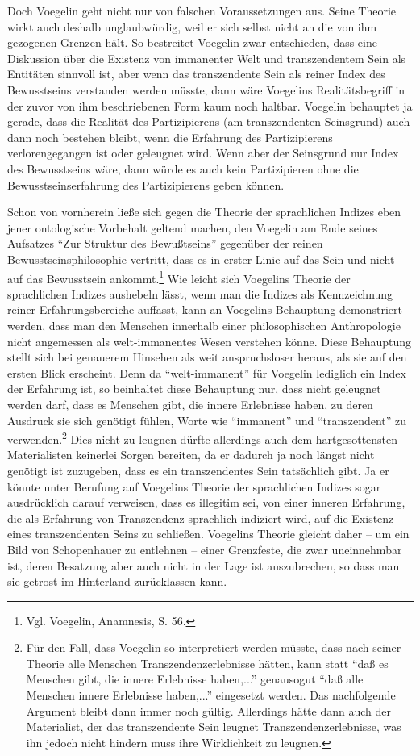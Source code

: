Doch Voegelin geht nicht nur von falschen Voraussetzungen aus. Seine Theorie
wirkt auch deshalb unglaubwürdig, weil er sich selbst nicht an die von ihm
gezogenen Grenzen hält. So bestreitet Voegelin zwar entschieden, dass eine
Diskussion über die Existenz von immanenter Welt und transzendentem Sein als
Entitäten sinnvoll ist, aber wenn das transzendente Sein als reiner Index des
Bewusstseins verstanden werden müsste, dann wäre Voegelins Realitätsbegriff in
der zuvor von ihm beschriebenen Form kaum noch haltbar. Voegelin behauptet ja
gerade, dass die Realität des Partizipierens (am transzendenten Seinsgrund)
auch dann noch bestehen bleibt, wenn die Erfahrung des Partizipierens
verlorengegangen ist oder geleugnet wird. Wenn aber der Seinsgrund nur Index
des Bewusstseins wäre, dann würde es auch kein Partizipieren ohne die
Bewusstseinserfahrung des Partizipierens geben können.

Schon von vornherein ließe sich gegen die Theorie der sprachlichen Indizes
eben jener ontologische Vorbehalt geltend machen, den Voegelin am Ende seines
Aufsatzes "`Zur Struktur des Bewußtseins"' gegenüber der reinen
Bewusstseinsphilosophie vertritt, dass es in erster Linie auf das Sein und
nicht auf das Bewusstsein ankommt.\footnote{Vgl. Voegelin, Anamnesis, S. 56.}
Wie leicht sich Voegelins Theorie der sprachlichen Indizes aushebeln lässt,
wenn man die Indizes als Kennzeichnung reiner Erfahrungsbereiche auf\/fasst,
kann an Voegelins Behauptung demonstriert werden, dass man den Menschen
innerhalb einer philosophischen Anthropologie nicht angemessen als
welt-immanentes Wesen verstehen könne. Diese Behauptung stellt sich bei
genauerem Hinsehen als weit anspruchsloser heraus, als sie auf den ersten Blick
erscheint. Denn da "`welt-immanent"' für Voegelin lediglich ein Index der
Erfahrung ist, so beinhaltet diese Behauptung nur, dass nicht geleugnet werden
darf, dass es Menschen gibt, die innere Erlebnisse haben, zu deren Ausdruck
sie sich genötigt fühlen, Worte wie "`immanent"' und "`transzendent"' zu
verwenden.\footnote{Für den Fall, dass Voegelin so interpretiert werden
  müsste, dass nach seiner Theorie alle Menschen Transzendenzerlebnisse
  hätten, kann statt "`daß es Menschen gibt, die innere Erlebnisse haben,..."'
  genausogut "`daß alle Menschen innere Erlebnisse haben,..."' eingesetzt
  werden. Das nachfolgende Argument bleibt dann immer noch gültig. Allerdings
  hätte dann auch der Materialist, der das transzendente Sein leugnet
  Transzendenzerlebnisse, was ihn jedoch nicht hindern muss ihre Wirklichkeit
  zu leugnen.} Dies nicht zu leugnen dürfte allerdings auch dem
hartgesottensten Materialisten keinerlei Sorgen bereiten, da er dadurch ja
noch längst nicht genötigt ist zuzugeben, dass es ein transzendentes Sein
tatsächlich gibt. Ja er könnte unter Berufung auf Voegelins Theorie der
sprachlichen Indizes sogar ausdrücklich darauf verweisen, dass es illegitim
sei, von einer inneren Erfahrung, die als Erfahrung von Transzendenz
sprachlich indiziert wird, auf die Existenz eines transzendenten Seins zu
schließen. Voegelins Theorie gleicht daher -- um ein Bild von Schopenhauer zu
entlehnen -- einer Grenzfeste, die zwar uneinnehmbar ist, deren Besatzung aber
auch nicht in der Lage ist auszubrechen, so dass man sie getrost im Hinterland
zurücklassen kann.

